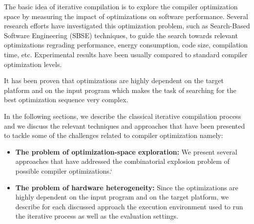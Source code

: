 The basic idea of iterative compilation is to explore the compiler optimization space by measuring the impact of optimizations on software performance.
Several research efforts have investigated this optimization problem, such as Search-Based Software Engineering (SBSE) techniques, to guide the search towards relevant optimizations regrading performance, energy consumption, code size, compilation time, etc. Experimental results have been usually compared to standard compiler optimization levels.  

It has been proven that optimizations are highly dependent on the target platform and on the input program which makes the task of searching for the best optimization sequence very complex\cite{triantafyllis2003compiler}.

In the following sections, we describe the classical iterative compilation process and we discuss the relevant techniques and approaches that have been presented to tackle some of the challenges related to compiler optimization namely:
\begin{itemize}
	\item \textbf{The problem of optimization-space exploration:} We present several approaches that have addressed the combinatorial explosion problem of possible compiler optimizations.`
	
	\item \textbf{The problem of hardware heterogeneity:} Since the optimizations are highly dependent on the input program and on the target platform, we describe for each discussed approach the execution environment used to run the iterative process as well as the evaluation settings.  
\end{itemize}


